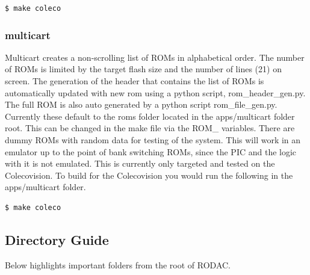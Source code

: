\documentclass{article}
\begin{document}
  \begin{lstlisting}[language=bash]
    $ make coleco
  \end{lstlisting}

  \subsubsection{multicart}

  \par
  Multicart creates a non-scrolling list of ROMs in alphabetical order. The number of ROMs is limited by the target flash size and the number of
  lines (21) on screen. The generation of the header that contains the list of ROMs is automatically updated with new rom using a python
  script, rom\_header\_gen.py. The full ROM is also auto generated by a python script rom\_file\_gen.py. Currently these default to the roms folder
  located in the apps/multicart folder root. This can be changed in the make file via the ROM\_\* variables. There are dummy ROMs with random data
  for testing of the system. This will work in an emulator up to the point of bank switching ROMs, since the PIC and the logic with it is not emulated.
  This is currently only targeted and tested on the Colecovision. To build for the Colecovision you would run the following in the apps/multicart folder.

  \begin{lstlisting}[language=bash]
    $ make coleco
  \end{lstlisting}

  \subsection{Directory Guide}

  \par
  Below highlights important folders from the root of RODAC.
\end{document}
